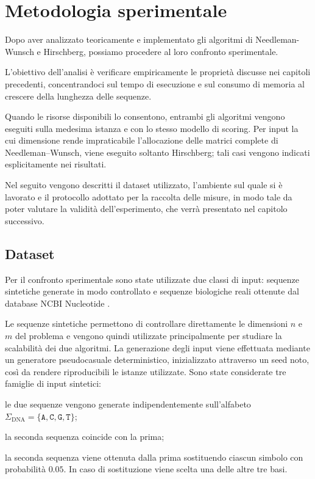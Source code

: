 \section{Metodologia sperimentale}
\label{sec:metodologia}

Dopo aver analizzato teoricamente e implementato gli algoritmi di Needleman-Wunsch e Hirschberg, possiamo
procedere al loro confronto sperimentale.

L'obiettivo dell'analisi è verificare empiricamente le proprietà discusse nei capitoli precedenti,
concentrandoci sul tempo di esecuzione e sul consumo di memoria al crescere della lunghezza
delle sequenze.

Quando le risorse disponibili lo consentono, entrambi gli algoritmi vengono eseguiti sulla medesima istanza e con lo stesso modello di scoring.
Per input la cui dimensione rende impraticabile l'allocazione delle matrici complete di Needleman--Wunsch, viene eseguito soltanto Hirschberg;
tali casi vengono indicati esplicitamente nei risultati.

Nel seguito vengono descritti il dataset utilizzato, l'ambiente sul quale si è lavorato e 
il protocollo adottato per la raccolta delle misure, in modo tale da poter valutare
la validità dell'esperimento, che verrà presentato nel capitolo successivo.

\subsection{Dataset}

Per il confronto sperimentale sono state utilizzate due classi di input: sequenze sintetiche generate in modo controllato
e sequenze biologiche reali ottenute dal database NCBI Nucleotide \cite{ncbi}.

Le sequenze sintetiche permettono di controllare direttamente le dimensioni $n$ e $m$ del problema e vengono quindi utilizzate
principalmente per studiare la scalabilità dei due algoritmi. La generazione degli input viene effettuata mediante un generatore
pseudocasuale deterministico, inizializzato attraverso un seed noto, così da rendere riproducibili le istanze utilizzate.
Sono state considerate tre famiglie di input sintetici:

\begin{description}[
    style=multiline,
    labelwidth=2cm,
    leftmargin=2.5cm,
    font=\ttfamily
]
    \item[random] le due sequenze vengono generate indipendentemente sull'alfabeto $\Sigma_{\text{DNA}}=\{\texttt{A},\texttt{C},\texttt{G},\texttt{T}\}$;

    \item[identiche] la seconda sequenza coincide con la prima;

    \item[mutate] la seconda sequenza viene ottenuta dalla prima sostituendo ciascun simbolo con probabilità $0.05$. In caso di sostituzione viene scelta una delle altre tre basi.
\end{description}

